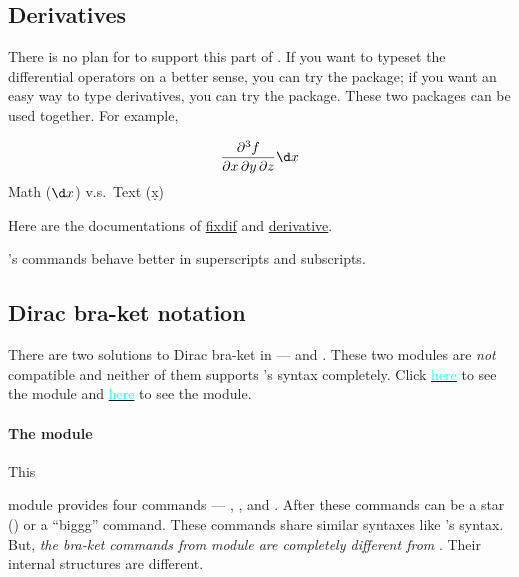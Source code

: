 \documentclass[11pt,letterpaper]{article}
\begin{document}
\subsection{Derivatives}
There is no plan for  to support this part of . If
you want to typeset the differential operators on a better sense, you can try
the  package; if you want an easy way to type derivatives, you
can try the  package. These two packages can be used
together. For example,
\begin{example}
\[ \pdv{f}{x,y,z} \d x \]
Math ($\d x$) v.s.\ Text (\d x)
\end{example}
Here are the documentations of
\href{http://mirrors.ctan.org/macros/latex/contrib/fixdif/fixdif.pdf}%
{\textsf{fixdif}} and
\href{http://mirrors.ctan.org/macros/latex/contrib/derivative/derivative%
.pdf}{\textsf{derivative}}.

's commands behave better in superscripts and subscripts.

\subsection{Dirac bra-ket notation}
There are two solutions to Dirac bra-ket in  --- 
and . These two modules are \emph{not} compatible and neither of
them supports 's syntax completely.
Click \hyperlink{para:ab.braket}{\textcolor{cyan}{here}} to see the
 module and \hyperlink{para:braket}{\textcolor{cyan}{here}}
to see the  module.

\paragraph{The  module}
\hypertarget{para:ab.braket}{This} module provides four commands --- , ,  and
. After these commands can be a star (\opt{*}) or a ``biggg''
command. These commands share similar syntaxes like 's syntax. But,
\emph{the bra-ket commands from  module are completely different
from }. Their internal structures are different.
\end{document}
